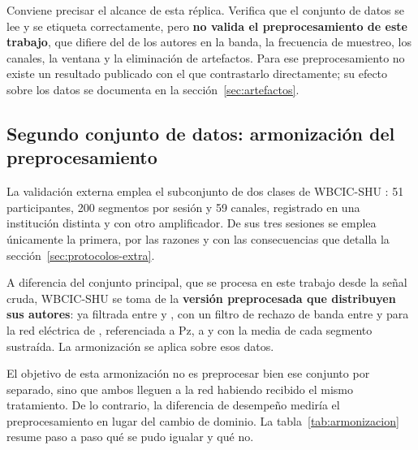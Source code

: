 Conviene precisar el alcance de esta réplica. Verifica que el conjunto de datos se lee y se
etiqueta correctamente, pero \textbf{no valida el preprocesamiento de este trabajo}, que
difiere del de los autores en la banda, la frecuencia de muestreo, los canales, la ventana y
la eliminación de artefactos. Para ese preprocesamiento no existe un resultado publicado con
el que contrastarlo directamente; su efecto sobre los datos se documenta en la
sección~\ref{sec:artefactos}.

\subsection{Segundo conjunto de datos: armonización del preprocesamiento}
\label{sec:wbcic-preproc}

La validación externa emplea el subconjunto de dos clases de WBCIC-SHU
\cite{yang2025wbcic}: 51 participantes, 200 segmentos por sesión y 59 canales,
registrado en una institución distinta y con otro amplificador. De sus tres
sesiones se emplea únicamente la primera, por las razones y con las consecuencias
que detalla la sección~\ref{sec:protocolos-extra}.

A diferencia del conjunto principal, que se procesa en este trabajo desde la señal cruda,
WBCIC-SHU se toma de la \textbf{versión preprocesada que distribuyen sus autores}: ya
filtrada entre  y , con un filtro de rechazo de banda entre  y 
para la red eléctrica de , referenciada a Pz, a  y con la media de cada
segmento sustraída. La armonización se aplica sobre esos datos.

El objetivo de esta armonización no es preprocesar bien ese conjunto por separado,
sino que ambos lleguen a la red habiendo recibido el mismo tratamiento. De lo
contrario, la diferencia de desempeño mediría el preprocesamiento en lugar del
cambio de dominio. La tabla~\ref{tab:armonizacion} resume paso a paso qué se pudo
igualar y qué no.


